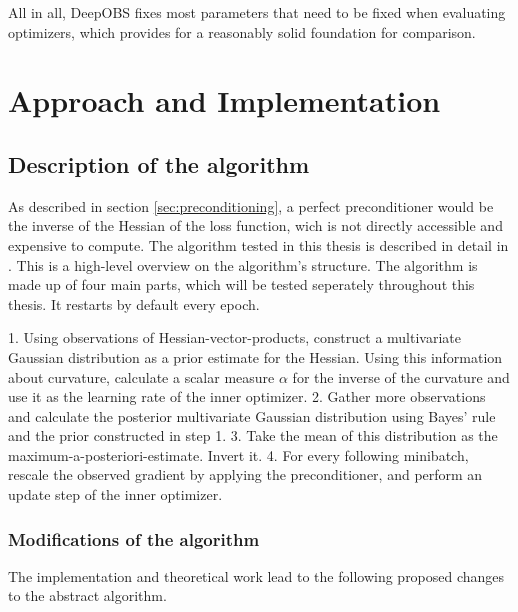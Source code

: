 \documentclass[twoside,12pt,a4paper]{report}
\begin{document}
All in all, DeepOBS fixes most parameters that need to be fixed when evaluating optimizers, which provides for a reasonably solid foundation for comparison.



\chapter{Approach and Implementation}
\section{Description of the algorithm}
As described in section \ref{sec:preconditioning}, a perfect preconditioner would be the inverse of the Hessian of the loss function, wich is not directly accessible and expensive to compute.
The algorithm tested in this thesis is described in detail in \cite{roos2019active}.
This is a high-level overview on the algorithm's structure.
The algorithm is made up of four main parts, which will be tested seperately throughout this thesis.
It restarts by default every epoch.
\begin{markdown}
1. Using observations of Hessian-vector-products, construct a multivariate Gaussian distribution as a prior estimate for the Hessian. Using this information about curvature, calculate a scalar measure $\alpha$ for the inverse of the curvature and use it as the learning rate of the inner optimizer.
2. Gather more observations and calculate the posterior multivariate Gaussian distribution using Bayes' rule and the prior constructed in step 1.
3. Take the mean of this distribution as the maximum-a-posteriori-estimate. Invert it.
4. For every following minibatch, rescale the observed gradient by applying the preconditioner, and perform an update step of the inner optimizer.
\end{markdown}


\subsection{Modifications of the algorithm}
The implementation and theoretical work lead to the following proposed changes to the abstract algorithm.
\end{document}
